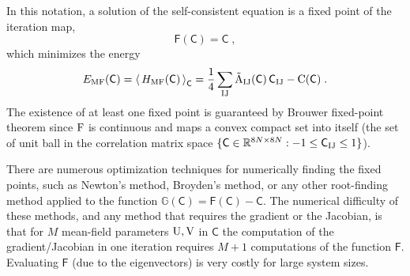 In this notation, a solution of the self-consistent equation is a fixed point of the iteration map,
\begin{equation}
    {\mathsf{F}}({\mathsf{C}}) = {\mathsf{C}} \; ,
\end{equation}
which minimizes the energy
\begin{equation}
    E_{\mathrm{MF}}({\mathsf{C}})
    =\braket{\, H_{\mathrm{MF}}({\mathsf{C}})\,}_{{\mathsf{C}}}
    = \frac{1}{4} \sum_{{\mathrm{I}}{\mathrm{J}}}    \tilde{\mathrm{A}}_{{\mathrm{I}}{\mathrm{J}}}({\mathsf{C}})\, {\mathsf{C}}_{{\mathrm{I}}{\mathrm{J}}}-\mathrm{C}({\mathsf{C}}) \; .
\end{equation}
The existence of at least one fixed point is guaranteed by Brouwer fixed-point theorem since $\mathrm{F}$ is continuous and maps a convex compact set into itself (the set of unit ball in the correlation matrix space  $\{{\mathsf{C}}\in\mathbb{R}^{8N\times8N} : -1\leq {\mathsf{C}}_{{\mathrm{I}}{\mathrm{J}}} \leq 1\}$).

There are numerous optimization techniques for numerically finding the fixed points, such as Newton's method, Broyden's method, or any other root-finding method applied to the function $\mathbb{G}({\mathsf{C}})={\mathsf{F}}({\mathsf{C}}) - {\mathsf{C}}$.
The numerical difficulty of these methods, and any method that requires the gradient or the Jacobian, is that for $M$ mean-field parameters $\mathrm{U},\mathrm{V}$  in ${\mathsf{C}}$ the computation of the gradient/Jacobian in one iteration requires $M+1$ computations of the function ${\mathsf{F}}$. Evaluating ${\mathsf{F}}$ (due to the eigenvectors) is very costly for large system sizes.


